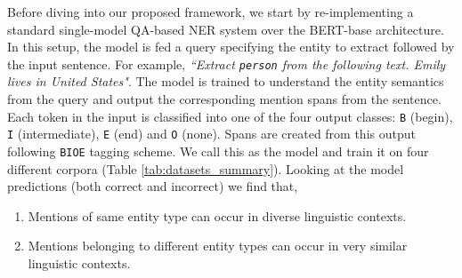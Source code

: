 Before diving into our proposed framework, we start by re-implementing a standard single-model QA-based NER system over the BERT-base architecture. In this setup, the model is fed a query specifying the entity to extract followed by the input sentence. For example, \textit{``Extract \texttt{person} from the following text. Emily lives in United States"}. The model is trained to understand the entity semantics from the query and output the corresponding mention spans from the sentence. Each token in the input is classified into one of the four output classes: \texttt{B} (begin), \texttt{I} (intermediate), \texttt{E} (end) and \texttt{O} (none). Spans are created from this output following \texttt{BIOE} tagging scheme. We call this as the  model and train it on four different corpora (Table \ref{tab:datasets_summary}). 
Looking at the model predictions (both correct and incorrect) we find that,
\begin{enumerate}
    \item Mentions of same entity type can occur in diverse linguistic contexts.
    \item Mentions belonging to different entity types can occur in very similar linguistic contexts.
\end{enumerate}

